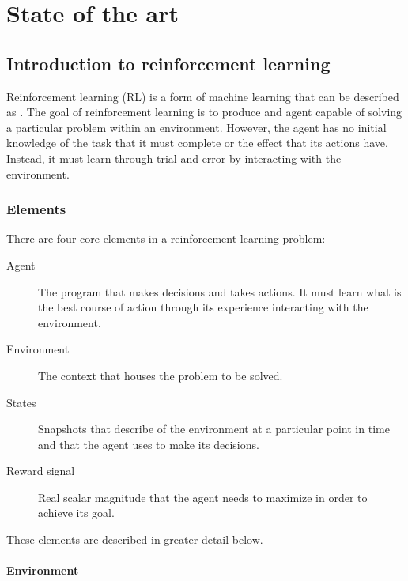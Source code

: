 \chapter{State of the art}
\label{chapter:state_of_the_art}


\section{Introduction to reinforcement learning}

Reinforcement learning (RL) is a form of machine learning that can be described as  \cite{Kaelbling:1996}. The goal of reinforcement learning is to produce and agent capable of solving a particular problem within an environment. However, the agent has no initial knowledge of the task that it must complete or the effect that its actions have. Instead, it must learn through trial and error by interacting with the environment.

\subsection{Elements}

There are four core elements in a reinforcement learning problem:

\begin{description}
    \item[Agent] The program that makes decisions and takes actions. It must learn what is the best course of action through its experience interacting with the environment.
    \item[Environment] The context that houses the problem to be solved.
    \item[States] Snapshots that describe of the environment at a particular point in time and that the agent uses to make its decisions.
    \item[Reward signal] Real scalar magnitude that the agent needs to maximize in order to achieve its goal.
\end{description}

These elements are described in greater detail below.

\subsubsection{Environment}

